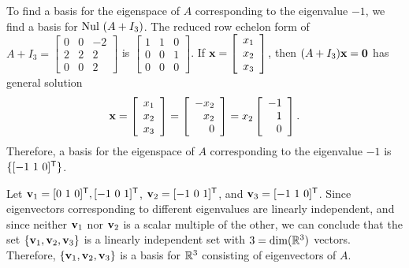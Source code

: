 \begin{example}
To find a basis for the eigenspace of $A$ corresponding to the eigenvalue $-1$, we find a basis for $\text{Nul } (A+I_3)$. The reduced row echelon form of $A + I_ 3 = \left[ \begin{array}{ccr} 0&0&-2 \\ 2&2&2 \\ 0&0&2 \end{array}\right]$ is $\left[ \begin{array}{ccc} 1&1&0 \\ 0&0&1 \\ 0&0&0 \end{array}\right]$. If $\mathbf{x} = \left[ \begin{array}{c} x_1\\x_2\\x_3 \end{array} \right]$, then $(A+I_3)\mathbf{x} = \mathbf{0}$ has general solution 
\[\mathbf{x} = \left[ \begin{array}{c} x_1\\x_2\\x_3 \end{array} \right] = \left[ \begin{array}{r} -x_2\\x_2\\0 \end{array} \right] = x_2 \left[ \begin{array}{r} -1\\1\\0 \end{array} \right].\]
Therefore, a basis for the eigenspace of $A$ corresponding to the eigenvalue $-1$ is $\{[-1 \ 1 \ 0]^{\mathsf{T}}\}$. 

\item Let $\vv_1 = [0 \ 1 \ 0]^{\tr}, [-1 \ 0 \ 1]^{\tr}$, $\vv_2 =  [-1 \ 0 \ 1]^{\tr}$, and $\vv_3 =  [-1 \ 1 \ 0]^{\tr}$. Since eigenvectors corresponding to different eigenvalues are linearly independent, and since neither $\mathbf{v}_1$ nor $\mathbf{v}_2$ is a scalar multiple of the other, we can conclude that the set $\{\mathbf{v}_1, \mathbf{v}_2, \mathbf{v}_3\}$ is a linearly independent set with $3 = \dim(\mathbb{R}^3)$ vectors.  Therefore, $\{\mathbf{v}_1, \mathbf{v}_2, \mathbf{v}_3\}$ is a basis for $\mathbb{R}^3$ consisting of eigenvectors of $A$. 

\ea

\end{example}

